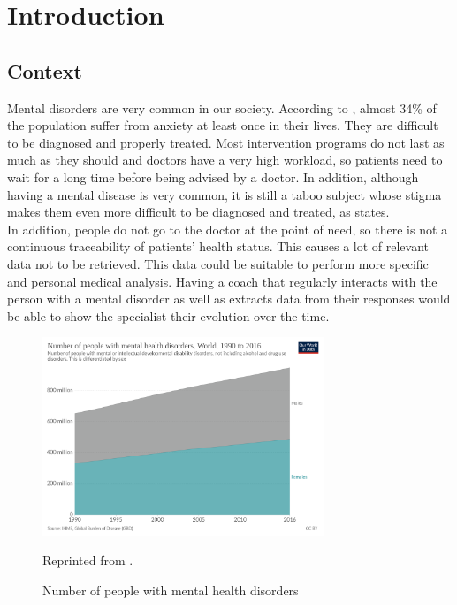 \documentclass[12pt,english]{article}
\begin{document}


\thispagestyle{empty}
\newpage
\tableofcontents{}
\newpage
\section{Introduction}
\subsection{Context}

Mental disorders are very common in our society. According to \cite{Bandelow2015}, almost 34\% of the population suffer from anxiety at least once in their lives. They are difficult to be diagnosed and properly treated. Most intervention programs do not last as much as they should and doctors have a very high workload, so patients need to wait for a long time before being advised by a doctor. In addition, although having a mental disease is very common, it is still a taboo subject whose stigma makes them even more difficult to be diagnosed and treated, as \cite{Davies2000} states.\\

In addition, people do not go to the doctor at the point of need, so there is not a continuous traceability of patients' health status. This causes a lot of relevant data not to be retrieved. This data could be suitable to perform more specific and personal medical analysis. Having a coach that regularly interacts with the person with a mental disorder as well as extracts data from their responses would be able to show the specialist their evolution over the time.

\begin{figure}[H]
  \centering
  \includegraphics[width=0.75\textwidth]{number_mental_health.png}
  \caption{Number of people with mental health disorders}{Reprinted from \cite{owidmentalhealth}.}
\end{figure}
\end{document}
